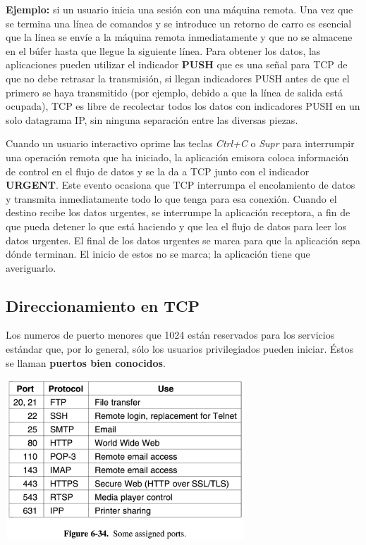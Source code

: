 \documentclass[10pt,a4paper]{report}
\begin{document}
	\textbf{Ejemplo:} si un usuario inicia una sesión con una máquina remota. Una vez que 
se termina una línea de comandos y se introduce un retorno de carro es esencial que la 
línea se envíe a la máquina remota inmediatamente y que no se almacene en el búfer 
hasta que llegue la siguiente línea. Para obtener los datos, las aplicaciones pueden 
utilizar el indicador \textbf{PUSH} que es una señal para TCP de que no debe retrasar 
la transmisión, si llegan indicadores PUSH antes de que el primero se haya transmitido 
(por ejemplo, debido a que la línea de salida está ocupada), TCP es libre de recolectar 
todos los datos con indicadores PUSH en un solo datagrama IP, sin ninguna separación 
entre las diversas piezas.

	\par Cuando un usuario interactivo oprime las teclas \emph{Ctrl+C} o \textit{Supr} para 
interrumpir una operación remota que ha iniciado, la aplicación emisora coloca 
información de control en el flujo de datos y se la da a TCP junto con el indicador 
\textbf{URGENT}. Este evento ocasiona que TCP interrumpa el encolamiento de datos 
y transmita inmediatamente todo lo que tenga para esa conexión. Cuando el destino 
recibe los datos urgentes, se interrumpe la aplicación receptora, a fin de que pueda 
detener lo que está haciendo y que lea el flujo de datos para leer los datos urgentes.
El final de los datos urgentes se marca para que la aplicación sepa dónde terminan.
El inicio de estos no se marca; la aplicación tiene que averiguarlo.

\subsection{Direccionamiento en TCP}

	\par Los numeros de puerto menores que 1024 están reservados para los servicios 
estándar que, por lo general, sólo los usuarios privilegiados pueden iniciar. Éstos se 
llaman \textbf{puertos bien conocidos}.

	\begin{center}
	\includegraphics[width=9cm, height=6cm]{./imagenes/protocolo.png} 
	\end{center}
\end{document}
